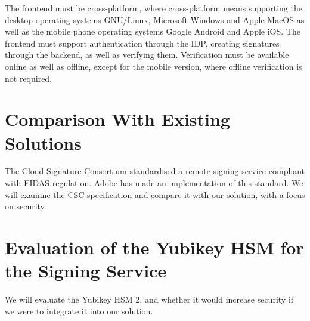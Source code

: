 The frontend must be cross-platform, where cross-platform means supporting the desktop operating systems
GNU/Linux, Microsoft Windows and Apple MacOS as well as the mobile phone operating systems Google Android and Apple iOS.
The frontend must support authentication through the \gls{IDP}, creating signatures through the backend, as well as verifying them.
Verification must be available online as well as offline, except for the mobile version, where offline verification is not required.

\section{Comparison With Existing Solutions}
\label{section:comparison}

The Cloud Signature Consortium standardised a remote signing service compliant with EIDAS regulation.
Adobe has made an implementation of this standard.
We will examine the \gls{CSC} specification and compare it with our solution, with a focus on security.

\section{Evaluation of the Yubikey HSM for the Signing Service}
\label{section:evaluateyubikey}

We will evaluate the Yubikey \gls{HSM} 2, and whether it would increase security if we were to integrate it into our solution.


